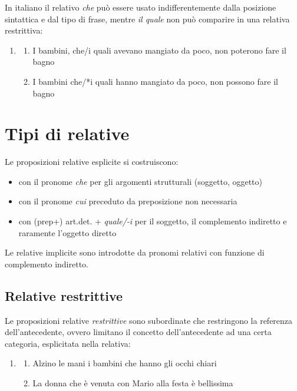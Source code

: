 \documentclass[
  a4paper,
  twoside,
  11pt,
  chapterprefix=false,
  bibliography=totocnumbered,
  listof=flat]{scrbook}
\providecommand{\tightlist}{%
  \setlength{\itemsep}{0pt}\setlength{\parskip}{0pt}}
\begin{document}
In italiano il relativo \emph{che} può essere usato indifferentemente dalla posizione sintattica e dal tipo di frase, mentre \emph{il quale} non può comparire in una relativa restrittiva:

\begin{enumerate}
\def\labelenumi{(\arabic{enumi})}
\setcounter{enumi}{133}
\item
  \begin{enumerate}
  \def\labelenumii{\alph{enumii}.}
  \tightlist
  \item
    I bambini, che/i quali avevano mangiato da poco, non poterono fare il bagno
  \item
    I bambini che/*i quali hanno mangiato da poco, non possono fare il bagno
  \end{enumerate}
\end{enumerate}

\hypertarget{tipi-di-relative}{%
\section{Tipi di relative}\label{tipi-di-relative}}

Le proposizioni relative esplicite si costruiscono:

\begin{itemize}
\item
  con il pronome \emph{che} per gli argomenti strutturali (soggetto, oggetto)
\item
  con il pronome \emph{cui} preceduto da preposizione non necessaria
\item
  con (prep+) art.det. + \emph{quale/-i} per il soggetto, il complemento indiretto e raramente l'oggetto diretto
\end{itemize}

Le relative implicite sono introdotte da pronomi relativi con funzione di complemento indiretto.

\hypertarget{relative-restrittive}{%
\subsection{Relative restrittive}\label{relative-restrittive}}

Le proposizioni relative \emph{restrittive} sono subordinate che restringono la referenza dell'antecedente, ovvero limitano il concetto dell'antecedente ad una certa categoria, esplicitata nella relativa:

\begin{enumerate}
\def\labelenumi{(\arabic{enumi})}
\setcounter{enumi}{134}
\item
  \begin{enumerate}
  \def\labelenumii{\alph{enumii}.}
  \tightlist
  \item
    Alzino le mani i bambini che hanno gli occhi chiari
  \item
    La donna che è venuta con Mario alla festa è bellissima
  \end{enumerate}
\end{enumerate}
\end{document}
